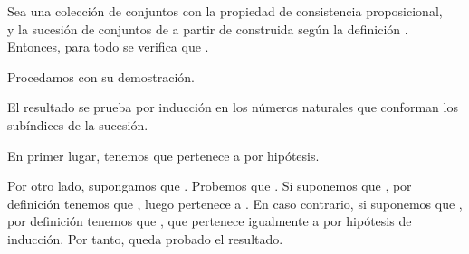 \begin{isabellebody}
\begin{isamarkuptext}
  \begin{lema}
    Sea  una colección de conjuntos con la propiedad de consistencia proposicional,\\  y 
     la sucesión de conjuntos de  a partir de  construida según la definición . 
    Entonces, para todo  se verifica que .
  \end{lema}

  Procedamos con su demostración.

  \begin{demostracion}
    El resultado se prueba por inducción en los números naturales que conforman los subíndices de la 
    sucesión.

    En primer lugar, tenemos que  pertenece a  por hipótesis.

    Por otro lado, supongamos que . Probemos que . Si suponemos que ,
    por definición tenemos que , luego pertenece a . En caso contrario, si
    suponemos que , por definición tenemos que , que pertenece igualmente
    a  por hipótesis de inducción. Por tanto, queda probado el resultado.
  \end{demostracion}


\end{isamarkuptext}
\end{isabellebody}

